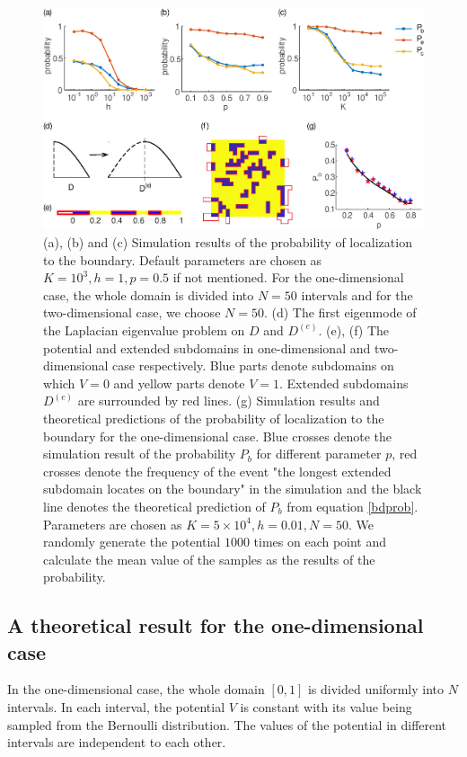 \documentclass[a4paper,11pt]{article}
\begin{document}
\begin{figure}
\centering
\includegraphics[width=\linewidth]{Fig3.eps}
\caption{(a), (b) and (c) Simulation results of the probability of localization to the boundary. Default parameters are chosen as $K = 10^3, h = 1, p = 0.5$ if not mentioned. For the one-dimensional case, the whole domain is divided into $N = 50$ intervals and for the two-dimensional case, we choose $N = 50$. (d) The first eigenmode of the Laplacian eigenvalue problem on $D$ and $D^{(e)}$. (e), (f) The potential and extended subdomains in one-dimensional and two-dimensional case respectively. Blue parts denote subdomains on which $V = 0$ and yellow parts denote $V = 1$. Extended subdomains $D^{(e)}$ are surrounded by red lines. (g) Simulation results and theoretical predictions of the probability of localization to the boundary for the one-dimensional case. Blue crosses denote the simulation result of the probability $P_b$ for different parameter $p$, red crosses denote the frequency of the event "the longest extended subdomain locates on the boundary" in the simulation and the black line denotes the theoretical prediction of $P_b$ from equation \eqref{bdprob}. Parameters are chosen as $K = 5 \times 10^4, h = 0.01, N = 50$. We randomly generate the potential $1000$ times on each point and calculate the mean value of the samples as the results of the probability.}
\label{fig3}
\end{figure}

\subsection{A theoretical result for the one-dimensional case}

In the one-dimensional case, the whole domain $[0, 1]$ is divided uniformly into $N$ intervals. In each interval, the potential $V$ is constant with its value being sampled from the Bernoulli distribution. The values of the potential in different intervals are independent to each other.
\end{document}
